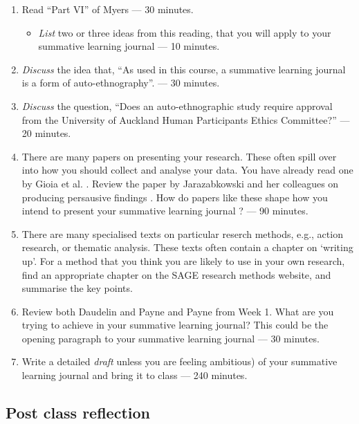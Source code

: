 \documentclass[]{book}
\providecommand{\tightlist}{%
  \setlength{\itemsep}{0pt}\setlength{\parskip}{0pt}}
\theoremstyle{definition}
\theoremstyle{definition}
\theoremstyle{definition}
\theoremstyle{remark}
\begin{document}
\begin{enumerate}
\def\labelenumi{\arabic{enumi}.}
\item
  Read ``Part VI'' of Myers \autocite*[
  p.~221--250]{myers_2013_qualitativeresearchbusiness} --- 30 minutes.

  \begin{itemize}
  \tightlist
  \item
    \emph{List} two or three ideas from this reading, that you will
    apply to your summative learning journal --- 10 minutes.
  \end{itemize}
\item
  \emph{Discuss} the idea that, ``As used in this course, a summative
  learning journal is a form of auto-ethnography''. --- 30 minutes.
\item
  \emph{Discuss} the question, ``Does an auto-ethnographic study require
  approval from the University of Auckland Human Participants Ethics
  Committee?'' --- 20 minutes.
\item
  There are many papers on presenting your research. These often spill
  over into how you should collect and analyse your data. You have
  already read one by Gioia et al.
  \autocite*{gioia_2013_seekingqualitativerigor}. Review the paper by
  Jarazabkowski and her colleagues on producing persausive findings
  \autocite{jarzabkowski_2014_producingpersuasivefindings}. How do
  papers like these shape how you intend to present your summative
  learning journal ? --- 90 minutes.
\item
  There are many specialised texts on particular reserch methods, e.g.,
  action research, or thematic analysis. These texts often contain a
  chapter on `writing up'. For a method that you think you are likely to
  use in your own research, find an appropriate chapter on the SAGE
  research methods website, and summarise the key points.
\item
  Review both Daudelin
  \autocite*{daudelin_1996_learningexperiencereflection}and Payne and
  Payne \autocite*{payne_2004_reflexivity} from Week 1. What are you
  trying to achieve in your summative learning journal? This could be
  the opening paragraph to your summative learning journal --- 30
  minutes.
\item
  Write a detailed \emph{draft} unless you are feeling ambitious) of
  your summative learning journal and bring it to class --- 240 minutes.
\end{enumerate}

\hypertarget{post-class-reflection-10}{%
\subsection{Post class reflection}\label{post-class-reflection-10}}
\end{document}
